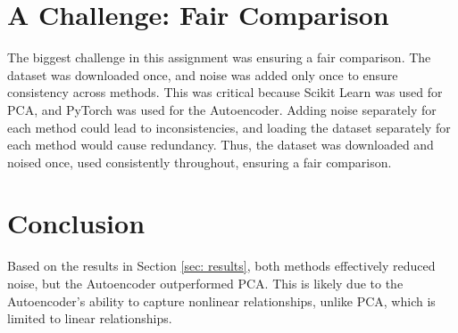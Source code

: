 \documentclass[12pt]{article}
\begin{document}
	\section{A Challenge: Fair Comparison}
	The biggest challenge in this assignment was ensuring a fair comparison. The dataset was downloaded once, and noise was added only once to ensure consistency across methods. This was critical because Scikit Learn was used for PCA, and PyTorch was used for the Autoencoder. Adding noise separately for each method could lead to inconsistencies, and loading the dataset separately for each method would cause redundancy. Thus, the dataset was downloaded and noised once, used consistently throughout, ensuring a fair comparison.
	
	\section{Conclusion}
	Based on the results in Section \ref{sec: results}, both methods effectively reduced noise, but the Autoencoder outperformed PCA. This is likely due to the Autoencoder’s ability to capture nonlinear relationships, unlike PCA, which is limited to linear relationships.
	
\end{document}

